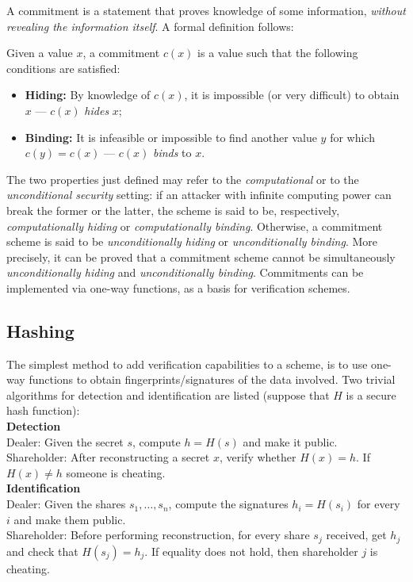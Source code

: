\documentclass[10pt,journal,cspaper,compsoc]{IEEEtran}
\begin{document}
A commitment  \cite{Blum1983} is a statement that proves knowledge of some information, \emph{without revealing the information itself}. 
A formal definition follows:

\begin{defn}[Commitment]
Given a value $x$, a commitment $c(x)$ is a value such that the following conditions are satisfied:
\begin{itemize}
\item \textbf{Hiding:} By knowledge of $c(x)$, it is impossible (or very difficult) to obtain $x$ --- $c(x)$ \emph{hides} $x$;
\item \textbf{Binding:} It is infeasible or impossible to find another value $y$ for which $c(y)=c(x)$ --- $c(x)$ \emph{binds} to $x$.
\end{itemize}
\end{defn}

The two properties just defined may refer to the \emph{computational} or to the \emph{unconditional security} setting: if an attacker with infinite computing power can break the former or the latter, the scheme is said to be, respectively, \emph{computationally hiding} or \emph{computationally binding}. Otherwise, a commitment scheme is said to be \emph{unconditionally hiding} or \emph{unconditionally binding}. More precisely, it can be proved \cite{books/sp/DelfsK02} that a commitment scheme cannot be simultaneously \emph{unconditionally hiding} and \emph{unconditionally binding}. Commitments can be implemented via one-way functions, as a basis for verification schemes.

\subsection{Hashing}
The simplest method to add verification capabilities to a scheme, is to use one-way functions to obtain fingerprints/signatures
of the data involved.
Two trivial algorithms for detection and identification are listed (suppose that $H$ is a secure hash function):\\

\textbf{Detection}\\
Dealer: Given the secret $s$, compute $h = H(s)$ and make it public.\\
Shareholder: After reconstructing a secret $x$, verify whether $H(x) = h$. If $H(x) \neq h$ someone is cheating.\\

\textbf{Identification}\\
Dealer: Given the shares $s_1,\ldots,s_n$, compute the signatures $h_i = H(s_i)$ for every $i$ and make them public.\\
Shareholder: Before performing reconstruction, for every share $s_j$ received, get $h_j$ and check that ${H(s_j) = h_j}$. If equality
does not hold, then shareholder $j$ is cheating.
\end{document}
